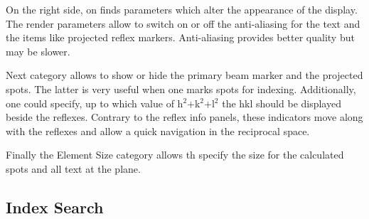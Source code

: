 On the right side, on finds parameters which alter the appearance of
the display. The render parameters allow to switch on or off the
anti-aliasing for the text and the items like projected reflex
markers. Anti-aliasing provides better quality but may be slower.

Next category allows to show or hide the primary beam marker and the
projected spots. The latter is very useful when one marks spots for
indexing. Additionally, one could specify, up to which value of
h$^2$+k$^2$+l$^2$ the hkl should be displayed beside the reflexes.
Contrary to the reflex info panels, these indicators move along with
the reflexes and allow a quick navigation in the reciprocal space.

Finally the Element Size category allows th specify the size for
the calculated spots and all text at the plane.


\subsection{Index Search}
\label{Clip:secIndexing}

